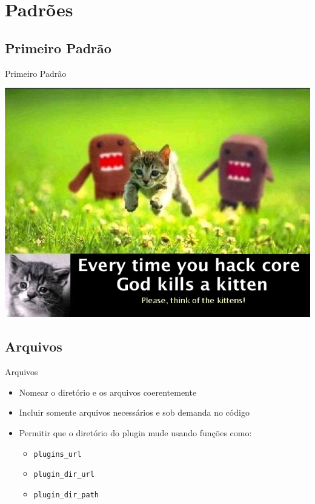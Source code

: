 \documentclass{beamer}
\begin{document}
\section{Padrões}

\begin{frame}\end{frame}

\subsection{Primeiro Padrão}

\begin{frame}{Primeiro Padrão}
\begin{center}
  \includegraphics[height=0.8\textheight]{./img/hack-core.jpg}
\end{center}
\end{frame}

\subsection{Arquivos}

\begin{frame}{Arquivos}
\begin{itemize}
  \pause \item Nomear o diretório e os arquivos coerentemente
  \pause \item Incluir somente arquivos necessários e sob demanda no código
  \pause \item Permitir que o diretório do plugin mude usando funções como:
  \begin{itemize}
    \pause \item \texttt{plugins\_url}
    \pause \item \texttt{plugin\_dir\_url}
    \pause \item \texttt{plugin\_dir\_path}
  \end{itemize}
\end{itemize}
\end{frame}
\end{document}
